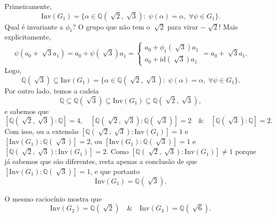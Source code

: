 \documentclass[../algebraIII_notes.tex]{subfiles}
\begin{document}
\begin{example}[Complicado]
	Primeiramente,
	\[
		\mathrm{Inv}(G_1) = \{\alpha \in \mathbb{Q}(\sqrt[]{2}, \sqrt[]{3}):\; \psi (\alpha ) = \alpha ,\; \forall \psi \in G_1\}.
	\]
	Qual é invariante a \(\phi_1\)? O grupo que não tem o \(\sqrt[]{2}\) para virar \(-\sqrt[]{2}\)! Mais explicitamente,
	\[
		\psi (a_{0}+\sqrt[]{3}a_1) = a_{0} + \psi(\sqrt[]{3})a_1 = \left\{\begin{array}{ll}
			a_{0} + \phi_1(\sqrt[]{3}) a_1 \\
			a_{0} + \mathrm{id}(\sqrt[]{3})a_1
		\end{array}\right.=a_{0}+\sqrt[]{3}a_1.
	\]
	Logo,
	\[
		\mathbb{Q}(\sqrt[]{3}) \subseteq \mathrm{Inv}(G_1) = \{\alpha \in \mathbb{Q}(\sqrt[]{2}, \sqrt[]{3}):\; \psi (\alpha ) = \alpha ,\; \forall \psi \in G_1\}.
	\]
	Por outro lado, temos a cadeia
	\[
		\mathbb{Q}\subseteq \mathbb{Q}(\sqrt[]{3})\subseteq \mathrm{Inv}(G_1)\subseteq \mathbb{Q}(\sqrt[]{2}, \sqrt[]{3}),
	\]
	e sabemos que
	\[
		[\mathbb{Q}(\sqrt[]{2}, \sqrt[]{3}):\mathbb{Q}]=4, \quad [\mathbb{Q}(\sqrt[]{2}, \sqrt[]{3}):\mathbb{Q}(\sqrt[]{3})]=2 \quad\&\quad [\mathbb{Q}(\sqrt[]{3}): \mathbb{Q}]=2.
	\]
	Com isso, ou a extensão \([\mathbb{Q}(\sqrt[]{2}, \sqrt[]{3}): \mathrm{Inv}(G_1)]=1\) e  \([\mathrm{Inv}(G_1):\mathbb{Q}(\sqrt[]{3})] = 2\), ou \([\mathrm{Inv}(G_1):\mathbb{Q}(\sqrt[]{3})] = 1\) e \([\mathbb{Q}(\sqrt[]{2}, \sqrt[]{3}): \mathrm{Inv}(G_1)]=2\).
	Como \([\mathbb{Q}(\sqrt[]{2}, \sqrt[]{3}): \mathrm{Inv}(G_1)]\neq 1\) porque já sabemos que são diferentes, resta apenas a conclusão de que \([\mathrm{Inv}(G_1):\mathbb{Q}(\sqrt[]{3})] = 1\), e que portanto
	\[
		\mathrm{Inv}(G_1) = \mathbb{Q}(\sqrt[]{3}).
	\]

	O mesmo raciocínio mostra que
	\[
		\mathrm{Inv}(G_2) = \mathbb{Q}(\sqrt[]{2}) \quad\&\quad \mathrm{Inv}(G_3) = \mathbb{Q}(\sqrt[]{6}).
	\]
\end{example}
\end{document}
